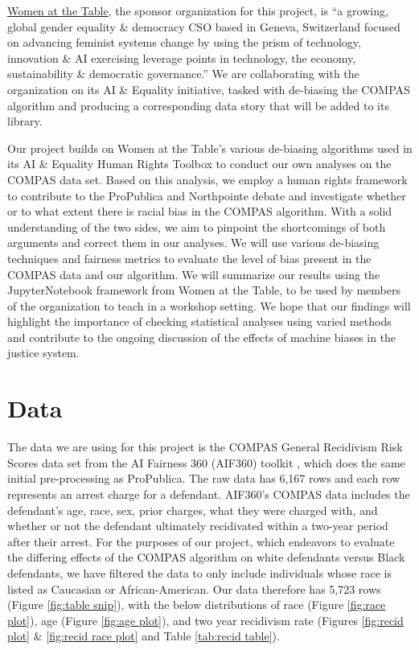 \documentclass[water,article,submit,moreauthors,pdftex]{mdpi}
\begin{document}
\href{https://www.womenatthetable.net/}{Women at the Table}, the sponsor
organization for this project, is ``a growing, global gender equality \&
democracy CSO based in Geneva, Switzerland focused on advancing feminist
systems change by using the prism of technology, innovation \& AI
exercising leverage points in technology, the economy, sustainability \&
democratic governance.'' We are collaborating with the organization on
its AI \& Equality \citep{noauthor_ai_nodate} initiative, tasked with
de-biasing the COMPAS algorithm \citep{aif360-oct-2018} and producing a
corresponding data story that will be added to its library.

Our project builds on Women at the Table's various de-biasing algorithms
used in its AI \& Equality Human Rights Toolbox to conduct our own
analyses on the COMPAS data set. Based on this analysis, we employ a
human rights framework to contribute to the ProPublica and Northpointe
debate and investigate whether or to what extent there is racial bias in
the COMPAS algorithm. With a solid understanding of the two sides, we
aim to pinpoint the shortcomings of both arguments and correct them in
our analyses. We will use various de-biasing techniques and fairness
metrics to evaluate the level of bias present in the COMPAS data and our
algorithm. We will summarize our results using the JupyterNotebook
framework from Women at the Table, to be used by members of the
organization to teach in a workshop setting. We hope that our findings
will highlight the importance of checking statistical analyses using
varied methods and contribute to the ongoing discussion of the effects
of machine biases in the justice system.

\hypertarget{data}{%
\section{Data}\label{data}}

The data we are using for this project is the COMPAS General Recidivism
Risk Scores data set from the AI Fairness 360 (AIF360) toolkit
\citep{aif360-oct-2018}, which does the same initial pre-processing as
ProPublica. The raw data has 6,167 rows and each row represents an
arrest charge for a defendant. AIF360's COMPAS data includes the
defendant's age, race, sex, prior charges, what they were charged with,
and whether or not the defendant ultimately recidivated within a
two-year period after their arrest. For the purposes of our project,
which endeavors to evaluate the differing effects of the COMPAS
algorithm on white defendants versus Black defendants, we have filtered
the data to only include individuals whose race is listed as Caucasian
or African-American. Our data therefore has 5,723 rows (Figure
\ref{fig:table snip}), with the below distributions of race (Figure
\ref{fig:race plot}), age (Figure \ref{fig:age plot}), and two year
recidivism rate (Figures \ref{fig:recid plot} \&
\ref{fig:recid race plot} and Table \ref{tab:recid table}).
\end{document}
